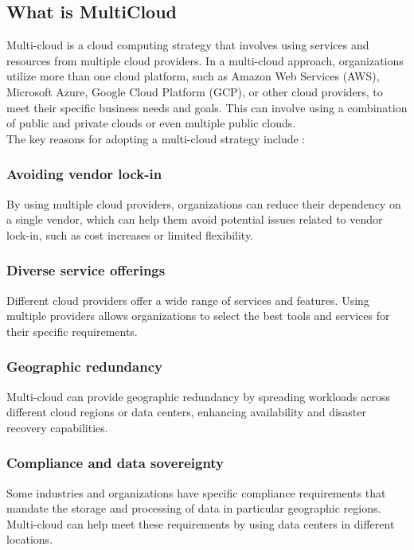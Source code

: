 \subsection{What is MultiCloud}

Multi-cloud is a cloud computing strategy that involves using services and resources from multiple cloud providers. 
In a multi-cloud approach, organizations utilize more than one cloud platform, such as Amazon Web Services (AWS), Microsoft Azure, Google Cloud Platform (GCP), 
or other cloud providers, to meet their specific business needs and goals. 
This can involve using a combination of public and private clouds or even multiple public clouds.\\

The key reasons for adopting a multi-cloud strategy include \cite{hongOverviewMulticloudComputing2019}:

\subsubsection{Avoiding vendor lock-in}
By using multiple cloud providers, organizations can reduce their dependency on a single vendor, 
which can help them avoid potential issues related to vendor lock-in, such as cost increases or limited flexibility.

\subsubsection{Diverse service offerings} 
Different cloud providers offer a wide range of services and features. 
Using multiple providers allows organizations to select the best tools and services for their specific requirements.

\subsubsection{Geographic redundancy} 
Multi-cloud can provide geographic redundancy by spreading workloads across different cloud regions or data centers, 
enhancing availability and disaster recovery capabilities.

\subsubsection{Compliance and data sovereignty}
Some industries and organizations have specific compliance requirements that mandate the storage and processing of 
data in particular geographic regions. Multi-cloud can help meet these requirements by using data centers in different locations.

